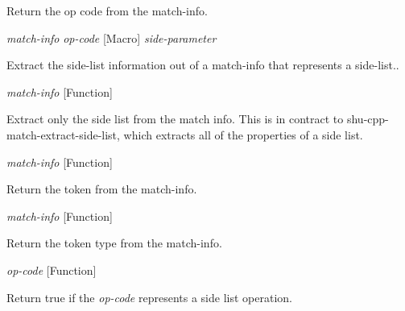 \begin{doc-string}
Return the op code from the match-info.
\end{doc-string}

\vspace{1em}
\noindent
{}
\usebox{\funcname}\emph{match-info} \emph{op-code}
 \hfill [Macro]
\hspace*{\wd\funcname}\emph{side-parameter}

\begin{doc-string}
Extract the side-list information out of a match-info that represents a side-list..
\end{doc-string}

\vspace{1em}
\noindent
{}
\usebox{\funcname}\emph{match-info}
 \hfill [Function]

\begin{doc-string}
Extract only the side list from the match info.  This is in contract to
shu-cpp-match-extract-side-list, which extracts all of the properties of a
side list.
\end{doc-string}

\vspace{1em}
\noindent
{}
\usebox{\funcname}\emph{match-info}
 \hfill [Function]

\begin{doc-string}
Return the token from the match-info.
\end{doc-string}

\vspace{1em}
\noindent
{}
\usebox{\funcname}\emph{match-info}
 \hfill [Function]

\begin{doc-string}
Return the token type from the match-info.
\end{doc-string}

\vspace{1em}
\noindent
{}
\usebox{\funcname}\emph{op-code}
 \hfill [Function]

\begin{doc-string}
Return true if the \emph{op-code} represents a side list operation.
\end{doc-string}

